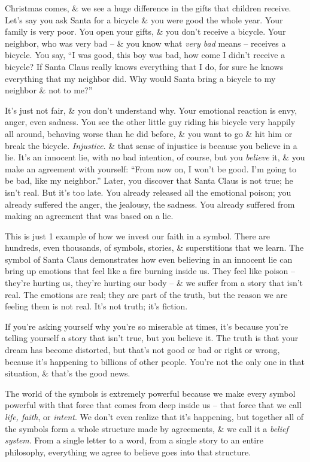 \documentclass{article}
\numberwithin{equation}{section}
\begin{document}
Christmas comes, \& we see a huge difference in the gifts that children receive. Let's say you ask Santa for a bicycle \& you were good the whole year. Your family is very poor. You open your gifts, \& you don't receive a bicycle. Your neighbor, who was very bad -- \& you know what \textit{very bad} means -- receives a bicycle. You say, ``I was good, this boy was bad, how come I didn't receive a bicycle? If Santa Claus really knows everything that I do, for sure he knows everything that my neighbor did. Why would Santa bring a bicycle to my neighbor \& not to me?''

It's just not fair, \& you don't understand why. Your emotional reaction is envy, anger, even sadness. You see the other little guy riding his bicycle very happily all around, behaving worse than he did before, \& you want to go \& hit him or break the bicycle. \textit{Injustice}. \& that sense of injustice is because you believe in a lie. It's an innocent lie, with no bad intention, of course, but you \textit{believe} it, \& you make an agreement with yourself: ``From now on, I won't be good. I'm going to be bad, like my neighbor.'' Later, you discover that Santa Claus is not true; he isn't real. But it's too late. You already released all the emotional poison; you already suffered the anger, the jealousy, the sadness. You already suffered from making an agreement that was based on a lie.

This is just 1 example of how we invest our faith in a symbol. There are hundreds, even thousands, of symbols, stories, \& superstitions that we learn. The symbol of Santa Claus demonstrates how even believing in an innocent lie can bring up emotions that feel like a fire burning inside us. They feel like poison -- they're hurting us, they're hurting our body -- \& we suffer from a story that isn't real. The emotions are real; they are part of the truth, but the reason we are feeling them is not real. It's not truth; it's fiction.

If you're asking yourself why you're so miserable at times, it's because you're telling yourself a story that isn't true, but you believe it. The truth is that your dream has become distorted, but that's not good or bad or right or wrong, because it's happening to billions of other people. You're not the only one in that situation, \& that's the good news.

The world of the symbols is extremely powerful because we make every symbol powerful with that force that comes from deep inside us -- that force that we call \textit{life, faith}, or \textit{intent}. We don't even realize that it's happening, but together all of the symbols form a whole structure made by agreements, \& we call it a \textit{belief system}. From a single letter to a word, from a single story to an entire philosophy, everything we agree to believe goes into that structure.
\end{document}
